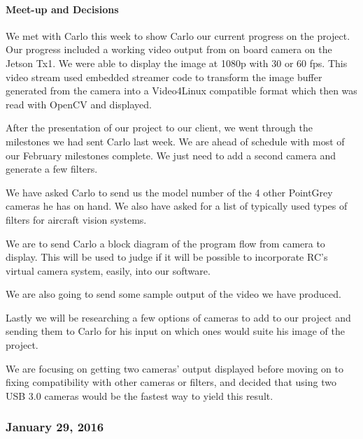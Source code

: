 \paragraph{Meet-up and Decisions}
We met with Carlo this week to show Carlo our current progress on the project. Our progress included a working video output from on board camera on the Jetson Tx1. We were able to display the image at 1080p with 30 or 60 fps. This video stream used embedded streamer code to transform the image buffer generated from the camera into a Video4Linux compatible format which then was read with OpenCV and displayed.
\par
After the presentation of our project to our client, we went through the milestones we had sent Carlo last week. We are ahead of schedule with most of our February milestones complete. We just need to add a second camera and generate a few filters.
\par
We have asked Carlo to send us the model number of the 4 other PointGrey cameras he has on hand. We also have asked for a list of typically used types of filters for aircraft vision systems.
\par
We are to send Carlo a block diagram of the program flow from camera to display. This will be used to judge if it will be possible to incorporate RC's virtual camera system, easily, into our software.
\par
We are also going to send some sample output of the video we have produced.
\par
Lastly we will be researching a few options of cameras to add to our project and sending them to Carlo for his input on which ones would suite his image of the project.
\par
We are focusing on getting two cameras' output displayed before moving on to fixing compatibility with other cameras or filters, and decided that using two USB 3.0 cameras would be the fastest way to yield this result.\\

\subsubsection{January 29, 2016}
